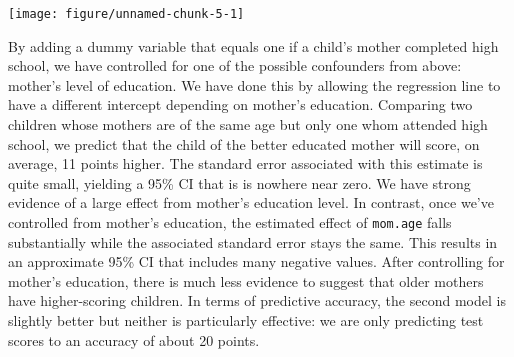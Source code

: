 \documentclass[addpoints,12pt]{exam}\usepackage[]{graphicx}\usepackage[]{color}
\makeatletter
\def\maxwidth{ %
  \ifdim\Gin@nat@width>\linewidth
    \linewidth
  \else
    \Gin@nat@width
  \fi
}
\newenvironment{knitrout}{}{} %
\makeatother
\begin{document}
\begin{questions}
\begin{parts}
\begin{solution}
\begin{knitrout}
{\centering \texttt{[image: figure/unnamed-chunk-5-1]} 

}



\end{knitrout}
  By adding a dummy variable that equals one if a child's mother completed high school, we have controlled for one of the possible confounders from above: mother's level of education. We have done this by allowing the regression line to have a different intercept depending on mother's education. Comparing two children whose mothers are of the same age but only one whom attended high school, we predict that the child of the better educated mother will score, on average, 11 points higher. The standard error associated with this estimate is quite small, yielding a 95\% CI that is is nowhere near zero. We have strong evidence of a large effect from mother's education level. In contrast, once we've controlled from mother's education, the estimated effect of \texttt{mom.age} falls substantially while the associated standard error stays the same. This results in an approximate 95\% CI that includes many negative values. After controlling for mother's education, there is much less evidence to suggest that older mothers have higher-scoring children. In terms of predictive accuracy, the second model is slightly better but neither is particularly effective: we are only predicting test scores to an accuracy of about 20 points.
  \end{solution}

\end{parts}
\end{questions}
\end{document}
